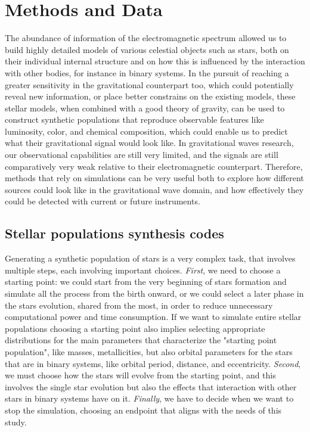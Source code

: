\chapter{Methods and Data}
The abundance of information of the electromagnetic spectrum allowed us to build highly detailed models of various celestial objects such as stars, both on their individual internal structure and on how this is influenced by the interaction with other bodies, for instance in binary systems.
In the pursuit of reaching a greater sensitivity in the gravitational counterpart too, which could potentially reveal new information, or place better constrains on the existing models, these stellar models, when combined with a good theory of gravity, can be used to construct synthetic populations that reproduce observable features like luminosity, color, and chemical composition, which could enable us to predict what their gravitational signal would look like.
In gravitational waves research, our observational capabilities are still very limited, and the signals are still comparatively very weak relative to their electromagnetic counterpart. 
Therefore, methods that rely on simulations can be very useful both to  explore how different sources could look like in the gravitational wave domain, and how effectively they could be detected with current or future instruments.

\section{Stellar populations synthesis codes}
Generating a synthetic population of stars is a very complex task, that involves multiple steps, each involving important choices.
\textit{First}, we need to choose a starting point: we could start from the very beginning of stars formation and simulate all the process from the birth onward, or we could select a later phase in the stars evolution, shared from the most, in order to reduce unnecessary computational power and time consumption. 
If we want to simulate entire stellar populations choosing a starting point also implies selecting appropriate distributions for the main parameters that characterize the "starting point population", like masses, metallicities, but also orbital parameters for the stars that are in binary systems, like orbital period, distance, and eccentricity. 
\textit{Second}, we must choose how the stars will evolve from the starting point, and this involves the single star evolution but also the effects that interaction with other stars in binary systems have on it.
\textit{Finally}, we have to decide when we want to stop the simulation, choosing an endpoint that aligns with the needs of this study.

